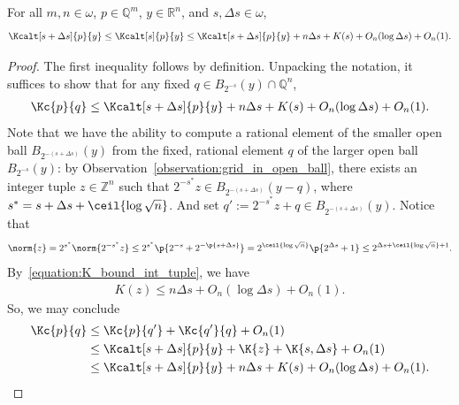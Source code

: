 \begin{lemma}
    \label{minmax_linear_sensitivity_in_s}
    For all $m, n \in \omega$, $p \in \mathbb{Q}^m$, $y \in \mathbb{R}^n$, and $s, \Delta s \in \omega$,
    \begin{align*}
        \Kcalt[s + \Delta s]{p}{y} \leq \Kcalt[s]{p}{y} \leq \Kcalt[s + \Delta s]{p}{y} + n \Delta s + K(s) + O_n(\log \Delta s) + O_n(1).
    \end{align*}
\end{lemma}
\begin{proof}
    The first inequality follows by definition. Unpacking the notation, it suffices to show that for any fixed $q \in B_{2^{-s}}(y) \cap \mathbb{Q}^n$,
    \begin{align*}
        \Kc{p}{q} \leq \Kcalt[s + \Delta s]{p}{y} + n \Delta s + K(s) + O_n(\log \Delta s) + O_n(1).
    \end{align*}
    Note that we have the ability to compute a rational element of the smaller open ball $B_{2^{-(s + \Delta s)}}(y)$ from the fixed, rational element $q$ of the larger open ball $B_{2^{-s}}(y)$: by Observation~\ref{observation:grid_in_open_ball}, there exists an integer tuple $z \in \mathbb{Z}^n$ such that $2^{-s^*} z \in B_{2^{-(s + \Delta s)}}(y - q)$, where $s^* = s + \Delta s + \ceil{\log \sqrt{n}}$. And set $q' := 2^{-s^*} z + q \in B_{2^{-(s + \Delta s)}}(y)$. Notice that
    \begin{align*}
        \norm{z} = 2^{s^*} \norm{2^{-s^*}z} \leq 2^{s^*} \p{2^{-s} + 2^{-\p{s + \Delta s}}} = 2^{\ceil{\log \sqrt{n}}} \p{2^{\Delta s} + 1} \leq 2^{\Delta s + \ceil{\log \sqrt{n}} + 1}.
    \end{align*}
    By~\eqref{equation:K_bound_int_tuple}, we have
    \begin{align*}
        K(z) \leq n \Delta s + O_n(\log \Delta s) + O_n(1).
    \end{align*}   
    So, we may conclude
    \begin{align*}
        \Kc{p}{q} &\leq \Kc{p}{q'} + \Kc{q'}{q} + O_n(1) \\
        &\leq \Kcalt[s + \Delta s]{p}{y} + \K{z} + \K{s, \Delta s} + O_n(1)\\
        &\leq \Kcalt[s + \Delta s]{p}{y} + n \Delta s + K(s) + O_n(\log \Delta s) + O_n(1).
    \end{align*}    
\end{proof}

